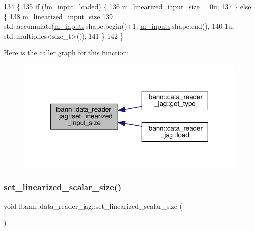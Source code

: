 \begin{DoxyCode}
134                                                 \{
135   \textcolor{keywordflow}{if} (!\hyperlink{classlbann_1_1data__reader__jag_ae047bbae82c4a8eceedceeea2e1815ad}{m\_input\_loaded}) \{
136     \hyperlink{classlbann_1_1data__reader__jag_a75e3c8870f9fc8e50fb24e4515ac7d82}{m\_linearized\_input\_size} = 0u;
137   \} \textcolor{keywordflow}{else} \{
138     \hyperlink{classlbann_1_1data__reader__jag_a75e3c8870f9fc8e50fb24e4515ac7d82}{m\_linearized\_input\_size}
139       = std::accumulate(\hyperlink{classlbann_1_1data__reader__jag_aa3ae2023ad77d767e717a24b91dbd548}{m\_inputs}.shape.begin()+1, \hyperlink{classlbann_1_1data__reader__jag_aa3ae2023ad77d767e717a24b91dbd548}{m\_inputs}.shape.end(),
140                         1u, std::multiplies<size\_t>());
141   \}
142 \}
\end{DoxyCode}
Here is the caller graph for this function\+:\nopagebreak
\begin{figure}[H]
\begin{center}
\leavevmode
\includegraphics[width=318pt]{classlbann_1_1data__reader__jag_a15f9aab2180ff66b7b5ace00957740df_icgraph}
\end{center}
\end{figure}
\mbox{\label{classlbann_1_1data__reader__jag_a27a1da4475453b043ba0ec1724317c27}} 
\subsubsection{\texorpdfstring{set\+\_\+linearized\+\_\+scalar\+\_\+size()}{set\_linearized\_scalar\_size()}}
{\footnotesize\ttfamily void lbann\+::data\+\_\+reader\+\_\+jag\+::set\+\_\+linearized\+\_\+scalar\+\_\+size (\begin{DoxyParamCaption}{ }\end{DoxyParamCaption})\hspace{0.3cm}{\ttfamily [protected]}}



